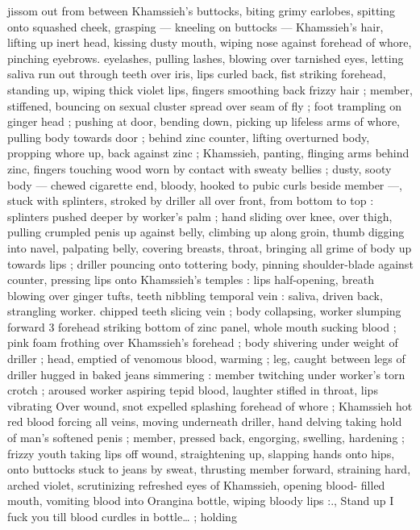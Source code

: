 {jissom out from between Khamssieh's buttocks, biting grimy 
earlobes, spitting onto squashed cheek, grasping --- kneeling on 
buttocks --- Khamssieh's hair, lifting up inert head, kissing dusty 
mouth, wiping nose against forehead of whore, pinching eyebrows. 
eyelashes, pulling lashes, blowing over tarnished eyes, letting saliva 
run out through teeth over iris, lips curled back, fist striking 
forehead, standing up, wiping thick violet lips, fingers smoothing 
back frizzy hair ; member, stiffened, bouncing on sexual cluster 
spread over seam of fly ; foot trampling on ginger head ; pushing at 
door, bending down, picking up lifeless arms of whore, pulling body 
towards door ; behind zinc counter, lifting overturned body, propping 
whore up, back against zinc ; Khamssieh, panting, flinging arms 
behind zinc, fingers touching wood worn by contact with sweaty 
bellies ; dusty, sooty body --- chewed cigarette end, bloody, hooked 
to pubic curls beside member ---, stuck with splinters, stroked by 
driller all over front, from bottom to top : splinters pushed deeper by 
worker's palm ; hand sliding over knee, over thigh, pulling crumpled 
penis up against belly, climbing up along groin, thumb digging into 
navel, palpating belly, covering breasts, throat, bringing all grime of 
body up towards lips ; driller pouncing onto tottering body, pinning 
shoulder-blade against counter, pressing lips onto Khamssieh's 
temples : lips half-opening, breath blowing over ginger tufts, teeth 
nibbling temporal vein : saliva, driven back, strangling worker. 
chipped teeth slicing vein ; body collapsing, worker slumping forward 
3 forehead striking bottom of zinc panel, whole mouth sucking blood 
; pink foam frothing over Khamssieh's forehead ; body shivering 
under weight of driller ; head, emptied of venomous blood, warming 
; leg, caught between legs of driller hugged in baked jeans 
simmering : member twitching under worker's torn crotch ; aroused 
worker aspiring tepid blood, laughter stifled in throat, lips vibrating 
Over wound, snot expelled splashing forehead of whore ; Khamssieh 
hot red blood forcing all veins, moving underneath driller, hand 
delving taking hold of man's softened penis ; member, pressed back, 
engorging, swelling, hardening ; frizzy youth taking lips off wound, 
straightening up, slapping hands onto hips, onto buttocks stuck to 
jeans by sweat, thrusting member forward, straining hard, arched 
violet, scrutinizing refreshed eyes of Khamssieh, opening blood- 
filled mouth, vomiting blood into Orangina bottle, wiping bloody lips 
:{\gl}., Stand up{\td} I fuck you till blood curdles in bottle{\ldots} ; holding 
}
